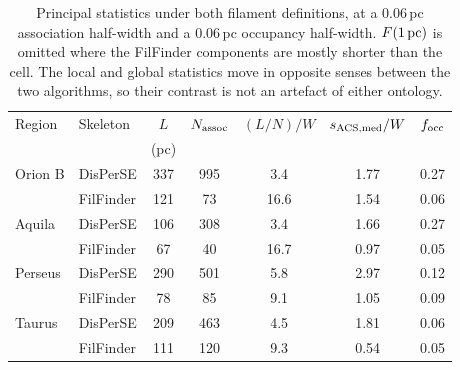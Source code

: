 \documentclass[usenatbib,twoside,twocolumn]{mnras}
\begin{document}
\begin{table}
\caption{Principal statistics under both filament definitions, at a $0.06$\,pc association half-width and a $0.06$\,pc occupancy half-width. $F(1\,{\rm pc})$ is omitted where the FilFinder components are mostly shorter than the cell. The local and global statistics move in opposite senses between the two algorithms, so their contrast is not an artefact of either ontology.}
\label{tab:ontology}
\footnotesize
\setlength{\tabcolsep}{3pt}
\begin{tabular}{llccccc}
\toprule
Region & Skeleton & $L$ & $N_{\rm assoc}$ & $(L/N)/W$ & $s_{\rm ACS,med}/W$ & $f_{\rm occ}$ \\
 & & (pc) & & & & \\
\midrule
Orion B & DisPerSE  & 337 & 995 & 3.4 & 1.77 & 0.27 \\
        & FilFinder & 121 &  73 & 16.6 & 1.54 & 0.06 \\
Aquila  & DisPerSE  & 106 & 308 & 3.4 & 1.66 & 0.27 \\
        & FilFinder &  67 &  40 & 16.7 & 0.97 & 0.05 \\
Perseus & DisPerSE  & 290 & 501 & 5.8 & 2.97 & 0.12 \\
        & FilFinder &  78 &  85 &  9.1 & 1.05 & 0.09 \\
Taurus  & DisPerSE  & 209 & 463 & 4.5 & 1.81 & 0.06 \\
        & FilFinder & 111 & 120 &  9.3 & 0.54 & 0.05 \\
\bottomrule
\end{tabular}
\end{table}
\end{document}
